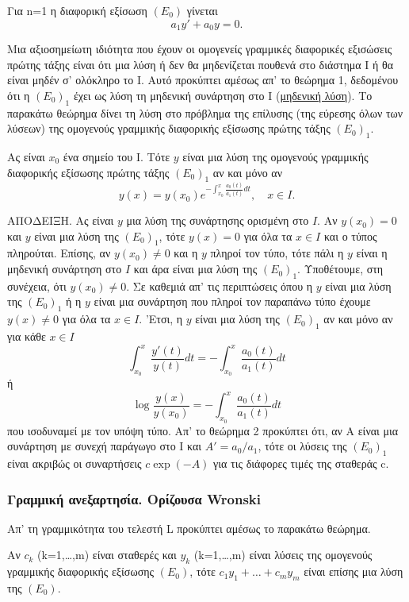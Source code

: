\documentclass[11pt,a4paper,twoside]{book}
\newcommand{\titlefont}[1]{{\fontfamily{maksf}\selectfont #1}}
\newcounter{thewrhma}[chapter]
\renewcommand{\thethewrhma}{\thechapter.\arabic{thewrhma}}
\newcommand{\thewr}{\refstepcounter{thewrhma}{\bf\titlefont{\textcolor{secondarycolor}{\large Θεώρημα\hspace{2mm}\thethewrhma}}}\hspace{1mm}}{}
\newenvironment{Thewrhma}[1]
{\begin{tcolorbox}[title=\thewr\ \ :\ \  {\textcolor{black}{\bf{\large\titlefont{#1}}}},
breakable,
enhanced standard,
titlerule=-.2pt,
toprule=0pt, 
rightrule=0pt, 
bottomrule=0pt,
colback=white,
left=2mm,
top=1mm,
bottom=0mm,
boxrule=0pt,
colframe=white,
borderline west={1.5mm}{0pt}{secondarycolor},
leftrule=2mm,
sharp corners,
coltitle=secondarycolor]}
{\end{tcolorbox}}
\begin{document}
Για n=1 η διαφορική εξίσωση $(E_0)$ γίνεται
\begin{equation}
a_1 y' + a_0 y = 0. \tag{$(E_0)_1$}
\end{equation}

Μια αξιοσημείωτη ιδιότητα που έχουν οι ομογενείς γραμμικές διαφορικές εξισώσεις πρώτης τάξης είναι ότι μια λύση ή δεν θα μηδενίζεται πουθενά στο διάστημα Ι ή θα είναι μηδέν σ' ολόκληρο το Ι. Αυτό προκύπτει αμέσως απ' το θεώρημα 1, δεδομένου ότι η $(E_0)_1$ έχει ως λύση τη μηδενική συνάρτηση στο Ι (\underline{μηδενική λύση}). Το παρακάτω θεώρημα δίνει τη λύση στο πρόβλημα της επίλυσης (της εύρεσης όλων των λύσεων) της ομογενούς γραμμικής διαφορικής εξίσωσης πρώτης τάξης $(E_0)_1$.

\begin{Thewrhma}{2}
Ας είναι $x_0$ ένα σημείο του Ι. Τότε $y$ είναι μια λύση της ομογενούς γραμμικής διαφορικής εξίσωσης πρώτης τάξης $(E_0)_1$ αν και μόνο αν
\[
y(x) = y(x_0) e^{- \int_{x_0}^{x} \frac{a_0(t)}{a_1(t)} dt}, \quad x \in I.
\]
\end{Thewrhma}

\textsc{ΑΠΟΔΕΙΞΗ.} Ας είναι $y$ μια λύση της συνάρτησης ορισμένη στο $Ι$. Αν $y(x_0)=0$ και $y$ είναι μια λύση της $(E_0)_1$, τότε $y(x)=0$ για όλα τα $x\in I$ και ο τύπος πληρούται. Επίσης, αν $y(x_0) \ne 0$ και η $y$ πληροί τον τύπο, τότε πάλι η $y$ είναι η μηδενική συνάρτηση στο $Ι$ και άρα είναι μια λύση της $(E_0)_1$. Υποθέτουμε, στη συνέχεια, ότι $y(x_0) \ne 0$. Σε καθεμιά απ' τις περιπτώσεις όπου η $y$ είναι μια λύση της $(E_0)_1$ ή η $y$ είναι μια συνάρτηση που πληροί τον παραπάνω τύπο έχουμε $y(x) \ne 0$ για όλα τα $x\in I$. 'Ετσι, η $y$ είναι μια λύση της $(E_0)_1$ αν και μόνο αν για κάθε $x\in I$
\[
\int_{x_0}^{x} \frac{y'(t)}{y(t)} dt = - \int_{x_0}^{x} \frac{a_0(t)}{a_1(t)} dt
\]
ή
\[
\log \frac{y(x)}{y(x_0)} = - \int_{x_0}^{x} \frac{a_0(t)}{a_1(t)} dt
\]
που ισοδυναμεί με τον υπόψη τύπο.
Απ' το θεώρημα 2 προκύπτει ότι, αν Α είναι μια συνάρτηση με συνεχή παράγωγο στο Ι και $A' = a_0/a_1$, τότε οι λύσεις της $(E_0)_1$ είναι ακριβώς οι συναρτήσεις $c \exp(-A)$ για τις διάφορες τιμές της σταθεράς c.

\subsubsection{Γραμμική ανεξαρτησία. Ορίζουσα Wronski}

Απ' τη γραμμικότητα του τελεστή L προκύπτει αμέσως το παρακάτω θεώρημα.

\begin{Thewrhma}{3}
Αν $c_k$ (k=1,\dots,m) είναι σταθερές και $y_k$ (k=1,\dots,m) είναι λύσεις της ομογενούς γραμμικής διαφορικής εξίσωσης $(E_0)$, τότε $c_1 y_1 + \dots + c_m y_m$ είναι επίσης μια λύση της $(E_0)$.
\end{Thewrhma}
\end{document}
